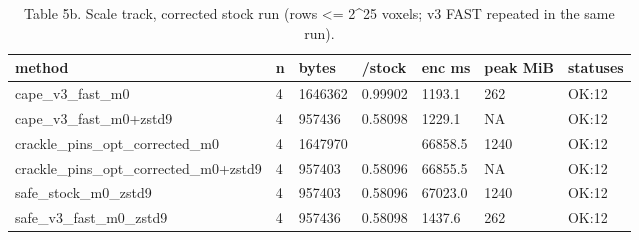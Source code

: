 \begin{table}[t]
\centering
\small
\caption{Table 5b. Scale track, corrected stock run (rows <= 2^25 voxels; v3 FAST repeated in the same run).}
\begin{tabular}{lllllll}
\hline
method & n & bytes & /stock & enc ms & peak MiB & statuses \\
\hline
cape\_v3\_fast\_m0 & 4 & 1646362 & 0.99902 & 1193.1 & 262 & OK:12 \\
cape\_v3\_fast\_m0+zstd9 & 4 & 957436 & 0.58098 & 1229.1 & NA & OK:12 \\
crackle\_pins\_opt\_corrected\_m0 & 4 & 1647970 &  & 66858.5 & 1240 & OK:12 \\
crackle\_pins\_opt\_corrected\_m0+zstd9 & 4 & 957403 & 0.58096 & 66855.5 & NA & OK:12 \\
safe\_stock\_m0\_zstd9 & 4 & 957403 & 0.58096 & 67023.0 & 1240 & OK:12 \\
safe\_v3\_fast\_m0\_zstd9 & 4 & 957436 & 0.58098 & 1437.6 & 262 & OK:12 \\
\hline
\end{tabular}
\end{table}
